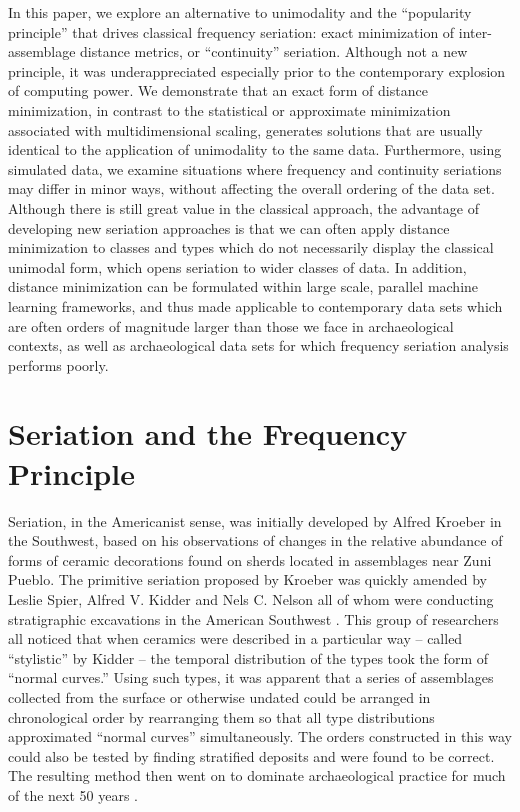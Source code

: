 In this paper, we explore an alternative to unimodality and the
``popularity principle'' that drives classical frequency seriation:
exact minimization of inter-assemblage distance metrics, or
``continuity'' seriation. Although not a new principle, it was
underappreciated especially prior to the contemporary explosion of
computing power. We demonstrate that an exact form of distance
minimization, in contrast to the statistical or approximate minimization
associated with multidimensional scaling, generates solutions that are
usually identical to the application of unimodality to the same data.
Furthermore, using simulated data, we examine situations where frequency
and continuity seriations may differ in minor ways, without affecting
the overall ordering of the data set. Although there is still great
value in the classical approach, the advantage of developing new
seriation approaches is that we can often apply distance minimization to
classes and types which do not necessarily display the classical
unimodal form, which opens seriation to wider classes of data. In
addition, distance minimization can be formulated within large scale,
parallel machine learning frameworks, and thus made applicable to
contemporary data sets which are often orders of magnitude larger than
those we face in archaeological contexts, as well as archaeological data
sets for which frequency seriation analysis performs poorly.

\section{Seriation and the Frequency
Principle}\label{seriation-and-the-frequency-principle}

Seriation, in the Americanist sense, was initially developed by Alfred
Kroeber \citep{Kroeber1916} in the Southwest, based on his observations
of changes in the relative abundance of forms of ceramic decorations
found on sherds located in assemblages near Zuni Pueblo. The primitive
seriation proposed by Kroeber was quickly amended by Leslie Spier,
Alfred V. Kidder and Nels C. Nelson all of whom were conducting
stratigraphic excavations in the American Southwest
\citep{Kidder1917, Nelson1916, Spier1917}. This group of researchers all
noticed that when ceramics were described in a particular way -- called
``stylistic'' by Kidder \citeyearpar{Kidder1917} -- the temporal
distribution of the types took the form of ``normal curves.'' Using such
types, it was apparent that a series of assemblages collected from the
surface or otherwise undated could be arranged in chronological order by
rearranging them so that all type distributions approximated ``normal
curves'' simultaneously. The orders constructed in this way could also
be tested by finding stratified deposits and were found to be correct.
The resulting method then went on to dominate archaeological practice
for much of the next 50 years \citep{lyman1997rise}.

